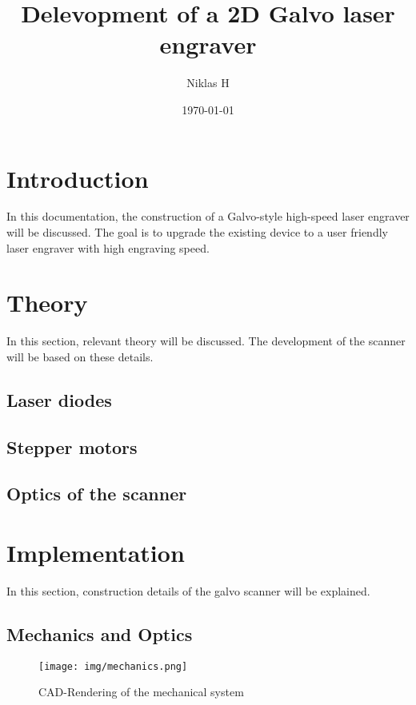 \documentclass[a4paper, 11pt]{scrartcl}
\title {Delevopment of a 2D Galvo laser engraver}
\author {Niklas H}
\date {\today}
\begin{document}
\maketitle
\tableofcontents
\newpage

\section{Introduction}
In this documentation, the construction of a Galvo-style high-speed laser engraver will be discussed. The goal is to upgrade the existing device to a user friendly laser engraver with high engraving speed.

\section{Theory}
In this section, relevant theory will be discussed. The development of the scanner will be based on these details. \\
\subsection{Laser diodes} 

\subsection{Stepper motors}

\subsection{Optics of the scanner} 


\section{Implementation}
In this section, construction details of the galvo scanner will be explained.
\subsection{Mechanics and Optics}
\begin{figure}[H]
\begin{center}
\texttt{[image: img/mechanics.png]}
\caption{CAD-Rendering of the mechanical system}
\label{mechanics}
\end{center}
\end{figure}


\end{document}
